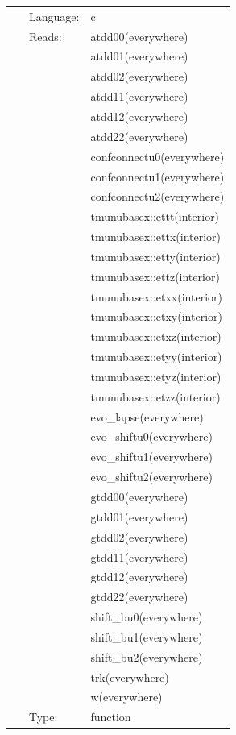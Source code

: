 \documentclass{article}
\begin{document}
 \begin{tabular*}{160mm}{cll} 
~ & Language:  & c \\ 
~ & Reads:  & atdd00(everywhere) \\ 
~& ~ &atdd01(everywhere)\\ 
~& ~ &atdd02(everywhere)\\ 
~& ~ &atdd11(everywhere)\\ 
~& ~ &atdd12(everywhere)\\ 
~& ~ &atdd22(everywhere)\\ 
~& ~ &confconnectu0(everywhere)\\ 
~& ~ &confconnectu1(everywhere)\\ 
~& ~ &confconnectu2(everywhere)\\ 
~& ~ &tmunubasex::ettt(interior)\\ 
~& ~ &tmunubasex::ettx(interior)\\ 
~& ~ &tmunubasex::etty(interior)\\ 
~& ~ &tmunubasex::ettz(interior)\\ 
~& ~ &tmunubasex::etxx(interior)\\ 
~& ~ &tmunubasex::etxy(interior)\\ 
~& ~ &tmunubasex::etxz(interior)\\ 
~& ~ &tmunubasex::etyy(interior)\\ 
~& ~ &tmunubasex::etyz(interior)\\ 
~& ~ &tmunubasex::etzz(interior)\\ 
~& ~ &evo\_lapse(everywhere)\\ 
~& ~ &evo\_shiftu0(everywhere)\\ 
~& ~ &evo\_shiftu1(everywhere)\\ 
~& ~ &evo\_shiftu2(everywhere)\\ 
~& ~ &gtdd00(everywhere)\\ 
~& ~ &gtdd01(everywhere)\\ 
~& ~ &gtdd02(everywhere)\\ 
~& ~ &gtdd11(everywhere)\\ 
~& ~ &gtdd12(everywhere)\\ 
~& ~ &gtdd22(everywhere)\\ 
~& ~ &shift\_bu0(everywhere)\\ 
~& ~ &shift\_bu1(everywhere)\\ 
~& ~ &shift\_bu2(everywhere)\\ 
~& ~ &trk(everywhere)\\ 
~& ~ &w(everywhere)\\ 
~ & Type:  & function \\ 

\end{tabular*}
\end{document}
